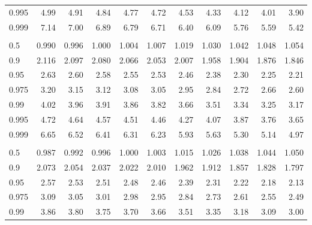 \documentclass[]{article}
\begin{document}
\begin{table}[H]
\begin{tabular}{lrrrrrrrrrr}
\hspace{1em}0.995 & 4.99 & 4.91 & 4.84 & 4.77 & 4.72 & 4.53 & 4.33 & 4.12 & 4.01 & 3.90\\
\hspace{1em}0.999 & 7.14 & 7.00 & 6.89 & 6.79 & 6.71 & 6.40 & 6.09 & 5.76 & 5.59 & 5.42\\
\addlinespace[0.3em]
\multicolumn{11}{l}{\textbf{$k_2=13$}}\\
\hspace{1em}0.5 & 0.990 & 0.996 & 1.000 & 1.004 & 1.007 & 1.019 & 1.030 & 1.042 & 1.048 & 1.054\\
\hspace{1em}0.9 & 2.116 & 2.097 & 2.080 & 2.066 & 2.053 & 2.007 & 1.958 & 1.904 & 1.876 & 1.846\\
\hspace{1em}0.95 & 2.63 & 2.60 & 2.58 & 2.55 & 2.53 & 2.46 & 2.38 & 2.30 & 2.25 & 2.21\\
\hspace{1em}0.975 & 3.20 & 3.15 & 3.12 & 3.08 & 3.05 & 2.95 & 2.84 & 2.72 & 2.66 & 2.60\\
\hspace{1em}0.99 & 4.02 & 3.96 & 3.91 & 3.86 & 3.82 & 3.66 & 3.51 & 3.34 & 3.25 & 3.17\\
\hspace{1em}0.995 & 4.72 & 4.64 & 4.57 & 4.51 & 4.46 & 4.27 & 4.07 & 3.87 & 3.76 & 3.65\\
\hspace{1em}0.999 & 6.65 & 6.52 & 6.41 & 6.31 & 6.23 & 5.93 & 5.63 & 5.30 & 5.14 & 4.97\\
\addlinespace[0.3em]
\multicolumn{11}{l}{\textbf{$k_2=14$}}\\
\hspace{1em}0.5 & 0.987 & 0.992 & 0.996 & 1.000 & 1.003 & 1.015 & 1.026 & 1.038 & 1.044 & 1.050\\
\hspace{1em}0.9 & 2.073 & 2.054 & 2.037 & 2.022 & 2.010 & 1.962 & 1.912 & 1.857 & 1.828 & 1.797\\
\hspace{1em}0.95 & 2.57 & 2.53 & 2.51 & 2.48 & 2.46 & 2.39 & 2.31 & 2.22 & 2.18 & 2.13\\
\hspace{1em}0.975 & 3.09 & 3.05 & 3.01 & 2.98 & 2.95 & 2.84 & 2.73 & 2.61 & 2.55 & 2.49\\
\hspace{1em}0.99 & 3.86 & 3.80 & 3.75 & 3.70 & 3.66 & 3.51 & 3.35 & 3.18 & 3.09 & 3.00\\

\end{tabular}
\end{table}
\end{document}
